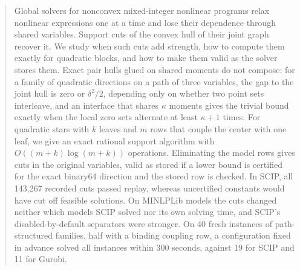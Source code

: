 \begin{abstract}
Global solvers for nonconvex mixed-integer nonlinear programs relax nonlinear
expressions one at a time and lose their dependence through shared variables. Support cuts of the convex hull of their joint graph recover it. We
study when such cuts add strength, how to compute them exactly for quadratic
blocks, and how to make them valid as the solver stores them. Exact pair hulls
glued on shared moments do not compose: for a family of quadratic directions
on a path of three variables, the gap to the joint hull is zero or
$\delta^2/2$, depending only on whether two point sets interleave, and an
interface that shares $\kappa$ moments gives the trivial bound exactly when the
local zero sets alternate at least $\kappa+1$ times. For quadratic stars with
$k$ leaves and $m$ rows that couple the center with one leaf, we give an exact
rational support algorithm with $O((m+k)\log(m+k))$ operations. Eliminating
the model rows gives cuts in the original variables, valid as stored if a
lower bound is certified for the exact binary64 direction and the stored row
is checked. In SCIP, all 143{,}267 recorded cuts passed
replay, whereas uncertified constants would have cut off feasible solutions.
On MINLPLib models the cuts changed neither which models SCIP solved nor its
own solving time, and SCIP's disabled-by-default separators were stronger. On 40 fresh instances
of path-structured families, half with a binding coupling row, a configuration
fixed in advance solved all instances within 300 seconds, against 19 for SCIP
and 11 for Gurobi.
\end{abstract}
